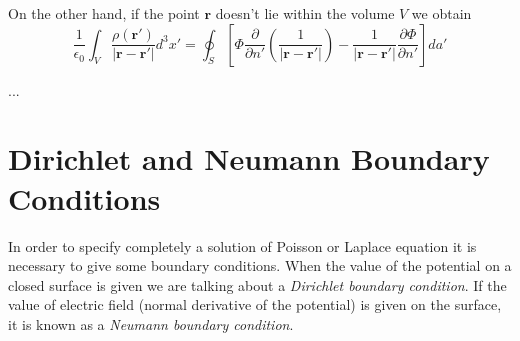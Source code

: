 On the other hand, if the point $\textbf{r}$ doesn't lie within the volume $V$ we obtain
\begin{equation}
 \frac{1}{ \epsilon_0} \int_V  \frac{\rho(\textbf{r}')}{\left| \textbf{r} - \textbf{r}' \right|}  d^3x'  = \oint_S \left[ \Phi \frac{\partial }{\partial n'} \left( \frac{1}{\left| \textbf{r} - \textbf{r}' \right|} \right) - \frac{1}{\left| \textbf{r} - \textbf{r}' \right|}  \frac{\partial \Phi}{\partial n'} \right] da'
\end{equation}

...

\section{Dirichlet and Neumann Boundary Conditions}
In order to specify completely a solution of Poisson or Laplace equation it is necessary to give some boundary conditions. When the value of the potential on a closed surface is given we are talking about a \textit{Dirichlet boundary condition}. If the value of electric field (normal derivative of the potential) is given on the surface, it is known as a \textit{Neumann boundary condition}.\\

